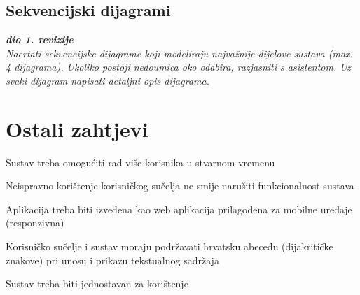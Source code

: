 \subsection{Sekvencijski dijagrami}

\textbf{\textit{dio 1. revizije}}\\

\textit{Nacrtati sekvencijske dijagrame koji modeliraju najvažnije dijelove sustava (max. 4 dijagrama). Ukoliko postoji nedoumica oko odabira, razjasniti s asistentom. Uz svaki dijagram napisati detaljni opis dijagrama.}
\eject

\section{Ostali zahtjevi}



\begin{packed_item}
	\item Sustav treba omogućiti rad više korisnika u stvarnom vremenu
	\item Neispravno korištenje korisničkog sučelja ne smije narušiti funkcionalnost sustava
	\item Aplikacija treba biti izvedena kao web aplikacija prilagođena za mobilne uređaje (responzivna)
	\item Korisničko sučelje i sustav moraju podržavati hrvatsku abecedu (dijakritičke znakove) pri unosu i prikazu tekstualnog sadržaja
	\item Sustav treba biti jednostavan za korištenje
	
\end{packed_item}

